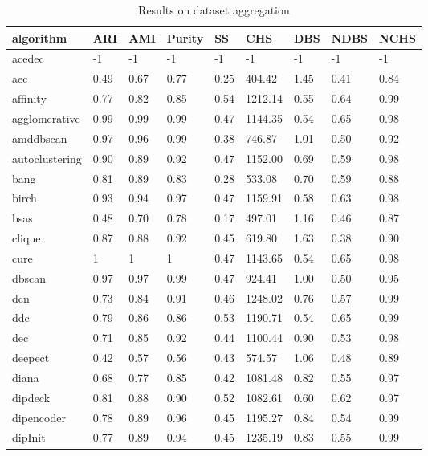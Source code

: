 \begin{table}[H]
\centering
\caption{Results on dataset aggregation}
\label{tab:params:aggregation}
\begin{tabular}{|l|l|l|l|l|l|l|l|l|}
\hline
algorithm & ARI & AMI & Purity & SS & CHS & DBS & NDBS & NCHS \\
\hline
acedec & -1 & -1 & -1 & -1 & -1 & -1 & -1 & -1 \\
\hline
aec & 0.49 & 0.67 & 0.77 & 0.25 & 404.42 & 1.45 & 0.41 & 0.84 \\
\hline
affinity & 0.77 & 0.82 & 0.85 & 0.54 & 1212.14 & 0.55 & 0.64 & 0.99 \\
\hline
agglomerative & 0.99 & 0.99 & 0.99 & 0.47 & 1144.35 & 0.54 & 0.65 & 0.98 \\
\hline
amddbscan & 0.97 & 0.96 & 0.99 & 0.38 & 746.87 & 1.01 & 0.50 & 0.92 \\
\hline
autoclustering & 0.90 & 0.89 & 0.92 & 0.47 & 1152.00 & 0.69 & 0.59 & 0.98 \\
\hline
bang & 0.81 & 0.89 & 0.83 & 0.28 & 533.08 & 0.70 & 0.59 & 0.88 \\
\hline
birch & 0.93 & 0.94 & 0.97 & 0.47 & 1159.91 & 0.58 & 0.63 & 0.98 \\
\hline
bsas & 0.48 & 0.70 & 0.78 & 0.17 & 497.01 & 1.16 & 0.46 & 0.87 \\
\hline
clique & 0.87 & 0.88 & 0.92 & 0.45 & 619.80 & 1.63 & 0.38 & 0.90 \\
\hline
cure & 1 & 1 & 1 & 0.47 & 1143.65 & 0.54 & 0.65 & 0.98 \\
\hline
dbscan & 0.97 & 0.97 & 0.99 & 0.47 & 924.41 & 1.00 & 0.50 & 0.95 \\
\hline
dcn & 0.73 & 0.84 & 0.91 & 0.46 & 1248.02 & 0.76 & 0.57 & 0.99 \\
\hline
ddc & 0.79 & 0.86 & 0.86 & 0.53 & 1190.71 & 0.54 & 0.65 & 0.99 \\
\hline
dec & 0.71 & 0.85 & 0.92 & 0.44 & 1100.44 & 0.90 & 0.53 & 0.98 \\
\hline
deepect & 0.42 & 0.57 & 0.56 & 0.43 & 574.57 & 1.06 & 0.48 & 0.89 \\
\hline
diana & 0.68 & 0.77 & 0.85 & 0.42 & 1081.48 & 0.82 & 0.55 & 0.97 \\
\hline
dipdeck & 0.81 & 0.88 & 0.90 & 0.52 & 1082.61 & 0.60 & 0.62 & 0.97 \\
\hline
dipencoder & 0.78 & 0.89 & 0.96 & 0.45 & 1195.27 & 0.84 & 0.54 & 0.99 \\
\hline
dipInit & 0.77 & 0.89 & 0.94 & 0.45 & 1235.19 & 0.83 & 0.55 & 0.99 \\

\end{tabular}
\end{table}
